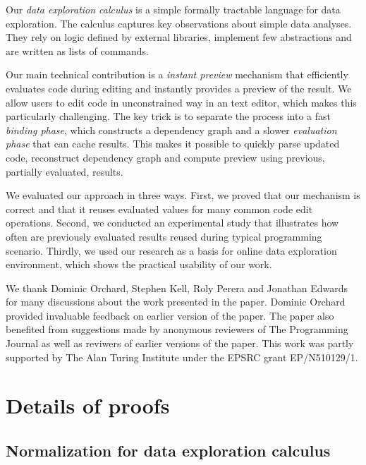 \documentclass[english,crc]{programming}
\theoremstyle{plain}
\theoremstyle{definition}
\begin{document}
Our \emph{data exploration calculus} is a simple formally tractable language
for data exploration. The calculus captures key observations about simple data analyses. They
rely on logic defined by external libraries, implement few abstractions and are written as lists of
commands.

Our main technical contribution is a \emph{instant preview} mechanism that efficiently evaluates
code during editing and instantly provides a preview of the result. We allow users to edit code
in unconstrained way in an text editor, which makes this particularly challenging. The key trick
is to separate the process into a fast \emph{binding phase}, which constructs a dependency graph
and a slower \emph{evaluation phase} that can cache results. This makes it possible to quickly parse
updated code, reconstruct dependency graph and compute preview using previous, partially
evaluated, results.

We evaluated our approach in three ways. First, we proved that our mechanism is correct and
that it reuses evaluated values for many common code edit operations. Second, we conducted an
experimental study that illustrates how often are previously evaluated results reused during
typical programming scenario. Thirdly, we used our research as a basis for online data exploration
environment, which shows the practical usability of our work.

\acks
We thank Dominic Orchard, Stephen Kell, Roly Perera and Jonathan Edwards for many discussions
about the work presented in the paper. Dominic Orchard provided invaluable feedback on earlier
version of the paper. The paper also benefited from suggestions made by anonymous reviewers
of The Programming Journal as well as reviwers of earlier versions of the paper.
This work was partly supported by The Alan Turing Institute under the EPSRC grant EP/N510129/1.


\printbibliography


\newpage
\appendix

\section{Details of proofs}

\subsection{Normalization for data exploration calculus}
\label{sec:app-normalization}
\end{document}

